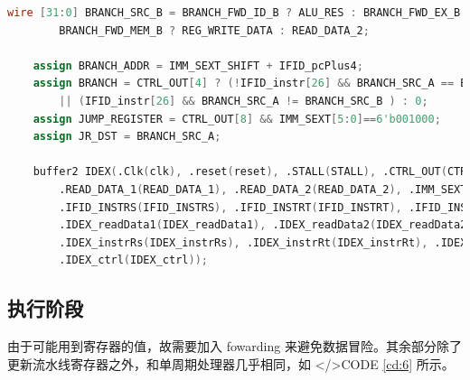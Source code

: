 \documentclass{progartcn}
\begin{document}
\begin{lstlisting}[language=verilog,caption={译码阶段},label={cd:5}]
    wire [31:0] BRANCH_SRC_B = BRANCH_FWD_ID_B ? ALU_RES : BRANCH_FWD_EX_B ? EXMEM_aluRes : 
        BRANCH_FWD_MEM_B ? REG_WRITE_DATA : READ_DATA_2;
    
    assign BRANCH_ADDR = IMM_SEXT_SHIFT + IFID_pcPlus4;
    assign BRANCH = CTRL_OUT[4] ? (!IFID_instr[26] && BRANCH_SRC_A == BRANCH_SRC_B )
        || (IFID_instr[26] && BRANCH_SRC_A != BRANCH_SRC_B ) : 0;
    assign JUMP_REGISTER = CTRL_OUT[8] && IMM_SEXT[5:0]==6'b001000;
    assign JR_DST = BRANCH_SRC_A;
    
    buffer2 IDEX(.Clk(clk), .reset(reset), .STALL(STALL), .CTRL_OUT(CTRL_OUT),
        .READ_DATA_1(READ_DATA_1), .READ_DATA_2(READ_DATA_2), .IMM_SEXT(IMM_SEXT),
        .IFID_INSTRS(IFID_INSTRS), .IFID_INSTRT(IFID_INSTRT), .IFID_INSTRD(IFID_INSTRD),
        .IDEX_readData1(IDEX_readData1), .IDEX_readData2(IDEX_readData2), .IDEX_immSext(IDEX_immSext),
        .IDEX_instrRs(IDEX_instrRs), .IDEX_instrRt(IDEX_instrRt), .IDEX_instrRd(IDEX_instrRd),
        .IDEX_ctrl(IDEX_ctrl));
\end{lstlisting}

\subsection{执行阶段}

由于可能用到寄存器的值，故需要加入 fowarding 来避免数据冒险。其余部分除了更新流水线寄存器之外，和单周期处理器几乎相同，如 </>CODE \ref{cd:6} 所示。
\end{document}
